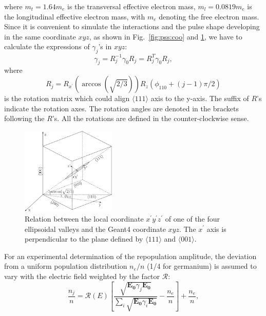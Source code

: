 where $m_{t} = 1.64m_{e}$ is the transversal effective electron mass, $m_{l} = 0.0819m_{e}$ is the longitudinal effective electron mass, with $m_{e}$ denoting the free electron mass. Since it is convenient to simulate the interactions and the pulse shape developing in the same coordinate $xyz$, as shown in Fig.~\ref{fig:pss:coo} and \ref{fig:pss:axes}, we have to calculate the expressions of $\gamma_{j}$'s in $xyz$:
\begin{equation}
\label{eq:pss:gs}
\gamma_{j} = R_{j}^{-1}\gamma_{0}R_{j} = R_{j}^{T}\gamma_{0}R_{j},
\end{equation}
where
\begin{equation}
\label{eq:pss:rs}
R_{j} = R_{x^{\prime}}(\arccos(\sqrt{2/3}))R_{z}(\phi_{110}+(j-1)\pi/2)
\end{equation}
is the rotation matrix which could align $\langle111\rangle$ axis to the y-axis. The suffix of $R$'s indicate the rotation axes. The rotation angles are denoted in the brackets following the $R$'s. All the rotations are defined in the counter-clockwise sense.

\begin{figure}
\centering
\includegraphics[width=0.4\textwidth]{axes}  
\caption{Relation between the local coordinate $x^{\prime}y^{\prime}z^{\prime}$ of one of the four ellipsoidal valleys and the Geant4 coordinate $xyz$. The $x^{\prime}$ axis is perpendicular to the plane defined by $\langle111\rangle$ and $\langle001\rangle$.}
\label{fig:pss:axes}
\end{figure}

For an experimental determination of the repopulation amplitude, the deviation from a uniform population distribution $n_{e}/n$ (1/4 for germanium) is assumed to vary with the electric field weighted by the factor $\mathcal{R}$:
\begin{equation}
\label{eq:pss:nion}
\frac{n_{j}}{n} = \mathcal{R}(E)   \left[         \frac{\sqrt{\mathbf{E_{0}}\gamma_{j}\mathbf{E_{0}}}}
{\sum_{i}\sqrt{\mathbf{E_{0}}\gamma_{i}\mathbf{E_{0}}}} -               \frac{n_{e}}{n} \right] + \frac{n_{e}}{n}, 
\end{equation}

